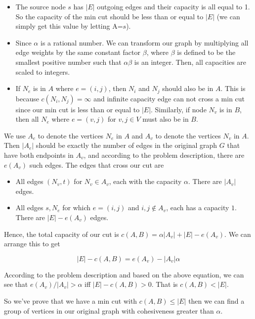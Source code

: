 \begin{itemize}
\item The source node $s$ has $|E|$ outgoing edges and their capacity is all equal to 1. So the capacity of the min cut should be less than or equal to $|E|$ (we can simply get this value by letting A=$s$).
\item Since $\alpha$ is a rational number. We can transform our graph by multiplying all edge weights by the same constant factor $\beta$, where $\beta$ is defined to be the smallest positive number such that $\alpha \beta$ is an integer. Then, all capacities are scaled to integers.
\item If $N_e$ is in $A$ where $e=(i, j)$, then $N_i$ and $N_j$ should also be in $A$. This is because $c(N_i, N_j) = \infty$ and infinite capacity edge can not cross a min cut since our min cut is less than or equal to $|E|$. Similarly, if node $N_v$ is in $B$, then all $N_e$ where $e=(v, j)$ for $v ,j\in V$ must also be in $B$.
\end{itemize}

We use $A_e$ to denote the vertices $N_e$ in $A$ and $A_v$ to denote the vertices $N_v$ in $A$. Then $|A_e|$ should be exactly the number of edges in the original graph $G$ that have both endpoints in $A_v$, and according to the problem description, there are $e(A_v)$ such edges. The edges that cross our cut are 

\begin{itemize}
\item All edges $(N_v, t)$ for $N_v \in A_v$, each with the capacity $\alpha$. There are $|A_v|$ edges.
\item All edges $s, N_e$ for which $e=(i,j)$ and $i,j \notin A_v$, each has a capacity $1$. There are $|E|-e(A_v)$ edges.
\end{itemize}

Hence, the total capacity of our cut is $c(A,B)=\alpha |A_v|+|E|-e(A_v)$. We can arrange this to get

\[ |E|-c(A,B) = e(A_v) - |A_v|\alpha \]

According to the problem description and based on the above equation, we can see that $e(A_v)/|A_v| > \alpha$ iff $|E|-c(A,B) > 0$. That is $c(A,B) < |E|$.

So we've prove that we have a min cut with $c(A,B) \le |E|$ then we can find a group of vertices in our original graph with cohesiveness greater than $\alpha$.


